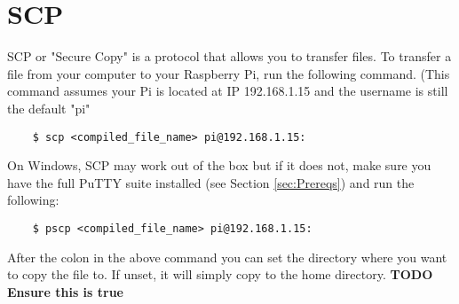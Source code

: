 \section{SCP}
\label{sec:SCP}
SCP or "Secure Copy" is a protocol that allows you to transfer files. \newline
To transfer a file from your computer to your Raspberry Pi, run the following command. (This command assumes your Pi is located at IP 192.168.1.15 and the username is still the default "pi"
\begin{verbatim}
    $ scp <compiled_file_name> pi@192.168.1.15:
\end{verbatim}
On Windows, SCP may work out of the box but if it does not, make sure you have the full PuTTY suite installed (see Section \ref{sec:Prereqs}) and run the following:
\begin{verbatim}
    $ pscp <compiled_file_name> pi@192.168.1.15:
\end{verbatim}
After the colon in the above command you can set the directory where you want to copy the file to. If unset, it will simply copy to the home directory. \textbf{TODO Ensure this is true}